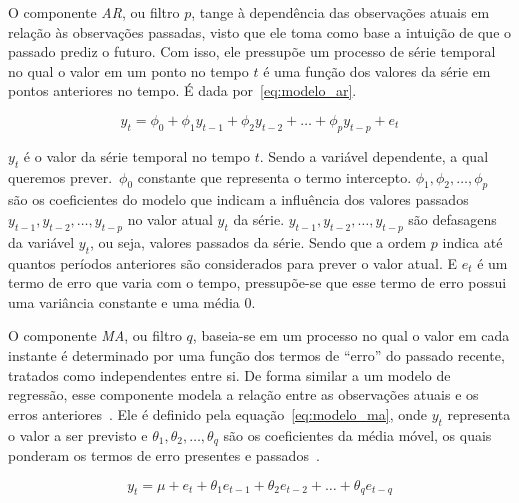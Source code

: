             O componente \emph{AR}, ou filtro \(p\), tange à dependência das observações atuais em relação às observações
            passadas, visto que ele toma como base a intuição de que o passado prediz o futuro. Com isso, ele 
            pressupõe um processo de série temporal no qual o valor em um ponto no tempo \(t\) é uma função
            dos valores da série em pontos anteriores no tempo. É dada por~\eqref{eq:modelo_ar}.
            
            \begin{equation}
                y_t = \phi_0 + \phi_1 y_{t-1} + \phi_2 y_{t-2} + \ldots + \phi_p y_{t-p} + e_t
                \label{eq:modelo_ar}
            \end{equation}
            
            \(y_t\) é o valor da série temporal no tempo \(t\). Sendo a variável dependente, a qual queremos
            prever.~\(\phi_0\) constante que representa o termo intercepto. 
            \(\phi_1, \phi_2, \ldots, \phi_p \) são os coeficientes do modelo que
            indicam a influência dos valores passados \(y_{t-1}, y_{t-2}, \ldots, y_{t-p}\) no valor atual 
            \(y_t\) da série. \(y_{t-1}, y_{t-2}, \ldots, y_{t-p}\) são defasagens da variável \(y_t\), ou seja,
            valores passados da série. Sendo que a ordem \(p\) indica até quantos períodos anteriores são 
            considerados para prever o valor atual. E \(e_t\) é um termo de erro que varia com o tempo, pressupõe-se 
            que esse termo de erro possui uma variância constante e uma média 0.

            O componente \emph{MA}, ou filtro \(q\), baseia-se em um processo no qual o valor em cada 
            instante é determinado por uma função dos termos de ``erro'' do passado recente, tratados como 
            independentes entre si. De forma similar a um modelo de regressão, esse componente modela a 
            relação entre as observações atuais e os erros anteriores~\cite{nielsen2021analise,correa2024}.
            Ele é definido pela equação~\eqref{eq:modelo_ma}, onde \(y_t\) representa o valor a ser previsto e 
            \( \theta_1, \theta_2, \ldots, \theta_q \) são os coeficientes da média móvel, os quais ponderam 
            os termos de erro presentes e passados~\cite{nielsen2021analise}.

            \begin{equation}
                y_t = \mu + e_t + \theta_1 e_{t-1} + \theta_2 e_{t-2} + \ldots + \theta_q e_{t-q}
                \label{eq:modelo_ma}
            \end{equation}

